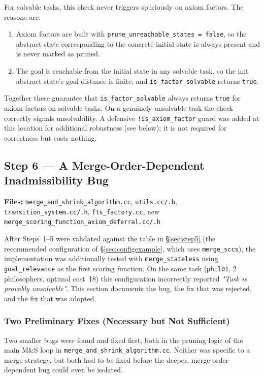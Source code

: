 \documentclass[11pt,a4paper]{article}
\begin{document}
For solvable tasks, this check never triggers spuriously on axiom factors.  The
reasons are:
\begin{enumerate}
  \item Axiom factors are built with \texttt{prune\_unreachable\_states~=~false},
    so the abstract state corresponding to the concrete initial state is always
    present and is never marked as pruned.
  \item The goal is reachable from the initial state in any solvable task, so
    the init abstract state's goal distance is finite, and
    \texttt{is\_factor\_solvable} returns \texttt{true}.
\end{enumerate}
Together these guarantee that \texttt{is\_factor\_solvable} always returns
\texttt{true} for axiom factors on solvable tasks.  On a genuinely unsolvable
task the check correctly signals unsolvability.  A defensive
\texttt{!is\_axiom\_factor} guard was added at this location for additional
robustness (see below); it is not required for correctness but costs nothing.

\subsection{Step 6 --- A Merge-Order-Dependent Inadmissibility Bug}
\label{sec:step6}

\textbf{Files:} \texttt{merge\_and\_shrink\_algorithm.cc}, \texttt{utils.cc/.h},
\texttt{transition\_system.cc/.h}, \texttt{fts\_factory.cc},
new \texttt{merge\_scoring\_function\_axiom\_deferral.cc/.h}

After Steps~1--5 were validated against the table in \S\ref{sec:step5} (the
recommended configuration of \S\ref{sec:configexample}, which uses
\texttt{merge\_sccs}), the implementation was additionally tested with
\texttt{merge\_stateless} using \texttt{goal\_relevance} as the first scoring
function. On the same task (\texttt{phil01}, 2 philosophers, optimal cost~18)
this configuration incorrectly reported \emph{"Task is provably unsolvable"}.
This section documents the bug, the fix that was rejected, and the fix that
was adopted.

\subsubsection{Two Preliminary Fixes (Necessary but Not Sufficient)}

Two smaller bugs were found and fixed first, both in the pruning logic of the
main M\&S loop in \texttt{merge\_and\_shrink\_algorithm.cc}. Neither was
specific to a merge strategy, but both had to be fixed before the deeper,
merge-order-dependent bug could even be isolated.
\end{document}
